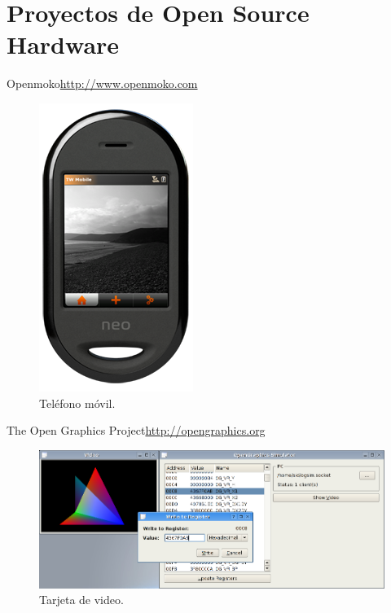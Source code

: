 \documentclass{beamer}
\begin{document}
\section{Proyectos de Open Source Hardware}


\begin{frame}{Openmoko}{\url{http://www.openmoko.com}}
  \begin{figure}
    \includegraphics[scale=0.65]{img/freerunner_shop1}
    \caption{Teléfono móvil.}
    \label{fig:openmoko}
  \end{figure}
\end{frame}

\begin{frame}{The Open Graphics Project}{\url{http://opengraphics.org}}
  \begin{figure}
    \includegraphics[scale=0.35]{img/ogsim-screen1}
    \caption{Tarjeta de video.}
    \label{fig:ogp}
  \end{figure}
\end{frame}
\end{document}
